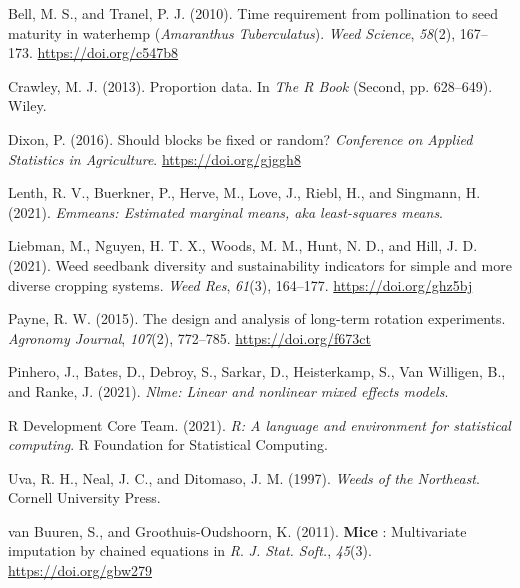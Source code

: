 \documentclass[
]{article}
\newlength{\cslhangindent}
\newlength{\cslentryspacingunit} %
\newenvironment{CSLReferences}[2] %
 {%
  \setlength{\parindent}{0pt}
  \ifodd #1
  \let\oldpar\par
  \def\par{\hangindent=\cslhangindent\oldpar}
  \fi
  \setlength{\parskip}{#2\cslentryspacingunit}
 }%
 {}
\begin{document}
\hypertarget{refs}{}
\begin{CSLReferences}{1}{0}
\leavevmode{}%
Bell, M. S., and Tranel, P. J. (2010). Time requirement from pollination to seed maturity in waterhemp ({\emph{Amaranthus}}{ \emph{Tuberculatus}}). \emph{Weed Science}, \emph{58}(2), 167--173. \url{https://doi.org/c547b8}

\leavevmode{}%
Crawley, M. J. (2013). Proportion data. In \emph{The {R Book}} (Second, pp. 628--649). {Wiley}.

\leavevmode{}%
Dixon, P. (2016). Should blocks be fixed or random? \emph{Conference on Applied Statistics in Agriculture}. \url{https://doi.org/gjggh8}

\leavevmode{}%
Lenth, R. V., Buerkner, P., Herve, M., Love, J., Riebl, H., and Singmann, H. (2021). \emph{Emmeans: {Estimated} marginal means, aka least-squares means}.

\leavevmode{}%
Liebman, M., Nguyen, H. T. X., Woods, M. M., Hunt, N. D., and Hill, J. D. (2021). Weed seedbank diversity and sustainability indicators for simple and more diverse cropping systems. \emph{Weed Res}, \emph{61}(3), 164--177. \url{https://doi.org/ghz5bj}

\leavevmode{}%
Payne, R. W. (2015). The design and analysis of long-term rotation experiments. \emph{Agronomy Journal}, \emph{107}(2), 772--785. \url{https://doi.org/f673ct}

\leavevmode{}%
Pinhero, J., Bates, D., Debroy, S., Sarkar, D., Heisterkamp, S., Van Willigen, B., and Ranke, J. (2021). \emph{Nlme: {Linear} and nonlinear mixed effects models}.

\leavevmode{}%
R Development Core Team. (2021). \emph{R: {A} language and environment for statistical computing}. R Foundation for Statistical Computing.

\leavevmode{}%
Uva, R. H., Neal, J. C., and Ditomaso, J. M. (1997). \emph{Weeds of the {Northeast}}. {Cornell University Press}.

\leavevmode{}%
van Buuren, S., and Groothuis-Oudshoorn, K. (2011). {\textbf{Mice}} : {Multivariate} imputation by chained equations in {\emph{R}}. \emph{J. Stat. Soft.}, \emph{45}(3). \url{https://doi.org/gbw279}


\end{CSLReferences}
\end{document}
